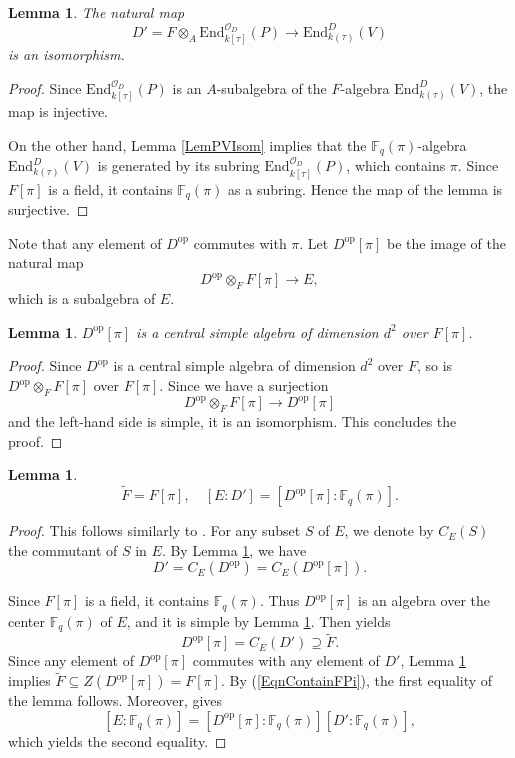 \documentclass[10pt]{amsart}
\theoremstyle{plain}
\newtheorem{lem}[thm]{Lemma}
\theoremstyle{definition}
\newcommand{\End}{\mathrm{End}}
\newcommand{\opp}{\mathrm{op}}
\newcommand{\cO}{\mathcal{O}}
\newcommand{\bF}{\mathbb{F}}
\begin{document}
\begin{lem}\label{LemCommutantsF}
	The natural map
	\[
	D'=F\otimes_A \End_{k[\tau]}^{\cO_D}(P)\to \End_{k(\tau)}^{D}(V)
	\]
	is an isomorphism.
\end{lem}
\begin{proof}
	Since $\End_{k[\tau]}^{\cO_D}(P)$ is an $A$-subalgebra of the $F$-algebra $\End_{k(\tau)}^{D}(V)$,
	the map is injective.
	
	On the other hand, Lemma \ref{LemPVIsom} implies that the $\bF_q(\pi)$-algebra $\End_{k(\tau)}^{D}(V)$ is generated by its subring 
	$\End_{k[\tau]}^{\cO_D}(P)$, which contains $\pi$. Since $F[\pi]$ is a field, 
	it contains $\bF_q(\pi)$ as a subring. Hence the map of the lemma is surjective.
\end{proof}


Note that any element of $D^\opp$ commutes with $\pi$.
Let $D^\opp[\pi]$ be the image of the natural map
\[
D^\opp\otimes_F F[\pi]\to E,
\]
which is a subalgebra of $E$.

\begin{lem}\label{LemDoppPi}
	$D^\opp[\pi]$ is a central simple algebra of dimension $d^2$ over $F[\pi]$.
\end{lem}
\begin{proof}
	Since $D^\opp$ is a central simple algebra of dimension $d^2$ over $F$, so is $D^\opp\otimes_F F[\pi]$ over $F[\pi]$.
	Since we have a surjection
	\[
	D^\opp\otimes_F F[\pi]\to D^\opp[\pi]
	\]
	and the left-hand side is simple, it is an isomorphism. This concludes the proof.
\end{proof}

\begin{lem}\label{LemCenterDprime}
	\[
	\tilde{F}=F[\pi],\quad [E:D']=[D^\opp[\pi]:\bF_q(\pi)].
	\]
\end{lem}
\begin{proof}
	This follows similarly to \cite[Proposition 2.2.2 (i)]{Lau}. 
	For any subset $S$ of $E$, we denote by $C_E(S)$ the commutant of $S$ in $E$. 
	By Lemma \ref{LemCommutantsF}, we have
	\[
	D'=C_E(D^\opp)=C_E(D^\opp[\pi]).
	\]
	
	Since $F[\pi]$ is a field, it contains $\bF_q(\pi)$.
	Thus $D^\opp[\pi]$ is an algebra over the center $\bF_q(\pi)$ of $E$,
	and it is simple by Lemma \ref{LemDoppPi}.
	Then \cite[Theorem 7.11]{Rei} yields
	\[
	D^\opp[\pi]=C_E(D')\supseteq \tilde{F}.
	\]
	Since any element of $D^\opp[\pi]$ commutes with any element of $D'$, 
	Lemma \ref{LemDoppPi} implies 
	$\tilde{F}\subseteq Z(D^\opp[\pi])=F[\pi]$.
	By (\ref{EqnContainFPi}), the first equality of the lemma follows. 
	Moreover, \cite[Corollary 7.13]{Rei} gives
	\[
	[E:\bF_q(\pi)]=[D^\opp[\pi]:\bF_q(\pi)][D':\bF_q(\pi)],
	\]
	which yields the second equality.
\end{proof}
\end{document}
